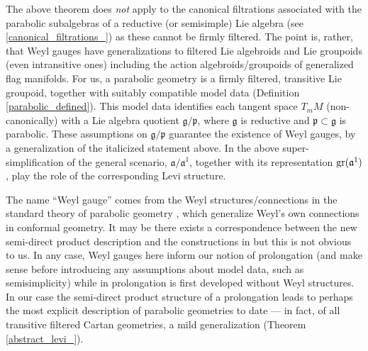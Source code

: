 \documentclass[leqno,12pt]{amsart} %
\begin{document}
The above theorem does {\em not} apply to the canonical filtrations associated with the
parabolic subalgebras of a reductive (or semisimple) Lie algebra (see
\ref{canonical_filtrations_}) as these cannot be firmly filtered. The point is, rather,
that Weyl gauges have generalizations to filtered Lie algebroids and Lie groupoids (even
intransitive ones) including the action algebroids/groupoids of generalized flag
manifolds. For us, a parabolic geometry is a firmly filtered, transitive Lie groupoid,
together with suitably compatible model data (Definition \ref{parabolic_defined}). This
model data identifies each tangent space $T_mM$ (non-canonically) with a Lie algebra
quotient ${\mathfrak g}/{\mathfrak p} $, where $\mathfrak g$ is reductive and
${\mathfrak p} \subset {\mathfrak g} $ is parabolic. These assumptions on
${\mathfrak g}/{\mathfrak p} $ guarantee the existence of Weyl gauges, by a generalization
of the italicized statement above. In the above super-simplification of the general
scenario, ${\mathfrak a}/{\mathfrak a}^1$, together with its representation
$\operatorname{\operatorname{gr}}({\mathfrak a}^1)$, play the role of the corresponding Levi structure.


The name ``Weyl gauge'' comes from the Weyl structures/connections in the standard theory
of parabolic geometry \cite{Cap_Slovak_09}, which generalize Weyl's own connections in
conformal geometry.  It may be there exists a correspondence between the new semi-direct
product description and the constructions in \cite{Cap_Slovak_09} but this is not obvious
to us. In any case, Weyl gauges here inform our notion of prolongation (and make sense
before introducing any assumptions about model data, such as semisimplicity) while in
\cite{Cap_Slovak_09} prolongation is first developed without Weyl structures. In our case
the semi-direct product structure of a prolongation leads to perhaps the most explicit
description of parabolic geometries to date --- in fact, of all transitive filtered Cartan
geometries, a mild generalization (Theorem \ref{abstract_levi_}).
\end{document}
